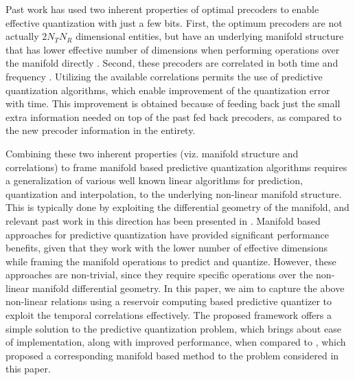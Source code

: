 \documentclass[conference]{IEEEtran}
\begin{document}
Past work has used two inherent properties of optimal precoders to enable effective quantization with just a few bits.
First, the optimum precoders are not actually $2N_TN_R$ dimensional entities, but have an underlying manifold structure that has lower effective number of dimensions when performing operations over the manifold directly \cite{pitaval2013codebooks}.
Second, these precoders are correlated in both time and frequency \cite{Gupt1905:Predictive}.
Utilizing the available correlations permits the use of predictive quantization algorithms, which enable improvement of the quantization error with time.
This improvement is obtained because of feeding back just the small extra information needed on top of the past fed back precoders, as compared to the new precoder information in the entirety.

Combining these two inherent properties (viz. manifold structure and correlations) to frame manifold based predictive quantization algorithms requires a generalization of various well known linear algorithms for prediction, quantization and interpolation, to the underlying non-linear manifold structure. This is typically done by exploiting the differential geometry of the manifold, and relevant past work in this direction has been presented in \cite{Gupt1905:Predictive,6891198,6545375,Li2016,chang2011adaptive}. Manifold based approaches for predictive quantization have provided significant performance benefits, given that they work with the lower number of effective dimensions while framing the manifold operations to predict and quantize.
However, these approaches are non-trivial, since they require specific operations over the non-linear manifold differential geometry.
In this paper, we aim to capture the above non-linear relations using a reservoir computing based predictive quantizer to exploit the temporal correlations effectively.
The proposed framework offers a simple solution to the predictive quantization problem, which brings about ease of implementation, along with improved performance, when compared to \cite{6891198}, which proposed a corresponding manifold based method to the problem considered in this paper.
\end{document}
